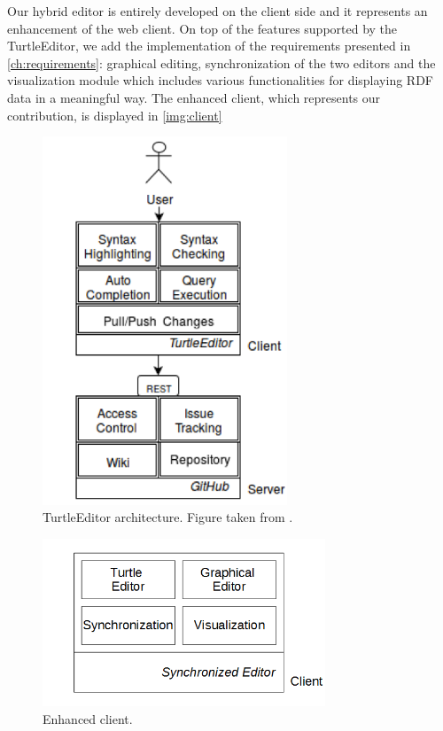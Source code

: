 Our hybrid editor is entirely developed on the client side and it represents an enhancement of the web client. On top of the features supported by the TurtleEditor, we add the implementation of the requirements presented in \autoref{ch:requirements}: graphical editing, synchronization of the two editors and the visualization module which includes various functionalities for displaying RDF data in a meaningful way. The enhanced client, which represents our contribution, is displayed in \autoref{img:client}

\begin{figure}[!htbp]
	\centering
  	\centerline{\includegraphics[height=11cm]{img/turtleeditor_architecture.png}}
	\caption{TurtleEditor architecture. Figure taken from \cite{Petersen2016}.}
	\label{img:turtle_architecture}
\end{figure}

\begin{figure}[!htbp]
	\centering
  	\centerline{\includegraphics[height=5cm]{img/client.png}}
	\caption{Enhanced client.}
	\label{img:client}
\end{figure}


